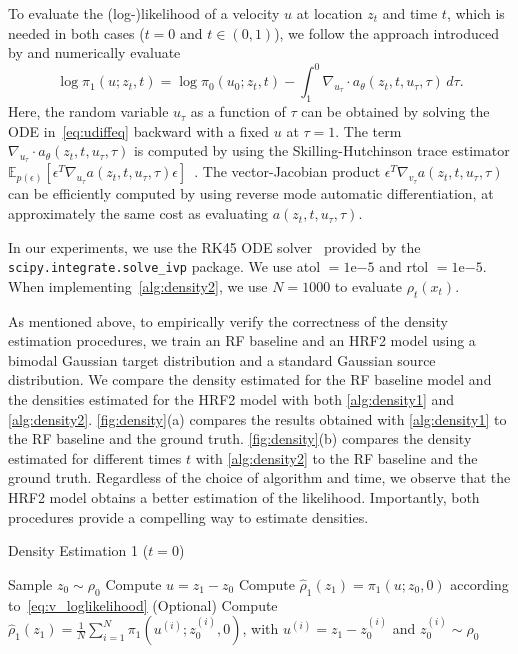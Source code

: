 To evaluate the (log-)likelihood of a velocity $u$ at location $z_t$ and time $t$, %
which is needed in both cases ($t=0$ and $t\in(0,1)$), we follow the approach introduced by \citet{ChenARXIV2018,SongICLR2021} and numerically evaluate 
\begin{equation}
\label{eq:v_loglikelihood}
\log \pi_1(u; z_t, t) = \log \pi_0(u_0; z_t, t) - \int_1^0 \nabla_{u_\tau} \cdot a_\theta(z_t, t, u_\tau, \tau)\, d \tau.
\end{equation}
Here, the random variable $u_\tau$ as a function of $\tau$ can be obtained by solving the ODE in~\cref{eq:udiffeq} backward with a fixed $u$ at $\tau = 1$. The term $\nabla_{u_\tau} \cdot a_\theta(z_t, t, u_\tau, \tau)$ is computed by using the Skilling-Hutchinson trace estimator $\mathbb{E}_{p(\epsilon)} \left[ \epsilon^T \nabla_{u_\tau} a(z_t, t, u_\tau, \tau) \epsilon\right]$~\citep{Skilling1989,hutchinson1989stochastic,GrathwohlICLR2018}.
The vector-Jacobian product $ \epsilon^T \nabla_{v_\tau} a(z_t, t, u_\tau, \tau)$ can be efficiently computed by using reverse mode automatic differentiation, at approximately the same cost as evaluating $a(z_t, t, u_\tau, \tau)$. 

In our experiments, we use the RK45 ODE solver~\citep{dormand1980family} provided by the  \texttt{scipy.integrate.solve{\_}ivp} package. We use atol $=1\mathrm{e}{-5}$ and rtol $=1\mathrm{e}{-5}$. When implementing~\cref{alg:density2}, we use $N = 1000$ to evaluate $\rho_t(x_t)$. 

As mentioned above, to empirically verify the correctness of the density estimation procedures, 
we train an RF baseline and an HRF2 model using a bimodal Gaussian target distribution and a standard Gaussian source distribution. We compare the density estimated for the RF baseline model and the densities estimated for the HRF2 model with both \cref{alg:density1} and \cref{alg:density2}. 
\cref{fig:density}(a) compares the results obtained with \cref{alg:density1} to the RF baseline and the ground truth. 
\cref{fig:density}(b) compares the density estimated for different times $t$ with \cref{alg:density2} to the RF baseline and the ground truth.
Regardless of the choice of algorithm and time, we observe that the HRF2 model obtains a better estimation of the likelihood. Importantly, both procedures provide a compelling way to estimate densities. 



\begin{algorithm}[t]
\caption{Density Estimation 1 ($t=0$)}\label{alg:density1}

Sample  $z_0\sim \rho_0$ \;
Compute $u = z_1 - z_0 $ \;
Compute $\hat{\rho}_1(z_1) = \pi_1(u; z_0, 0)$ according to~\cref{eq:v_loglikelihood} \;
(Optional) Compute $\hat{\rho}_1(z_1) = \frac{1}{N} \sum_{i = 1}^N \pi_1(u^{(i)}; z^{(i)}_0, 0)$, with $u^{(i)} = z_1 - z^{(i)}_0$  and $z^{(i)}_0\sim \rho_0$ \;
\end{algorithm}

